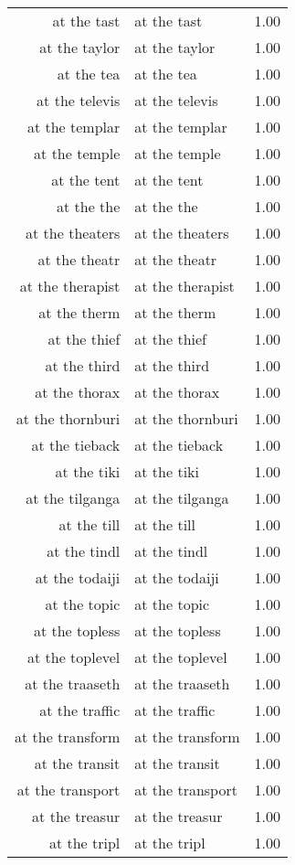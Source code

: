 \begin{table}[ht]
\begin{tabular}{rlr}
  at the tast & at the tast & 1.00 \\ 
  at the taylor & at the taylor & 1.00 \\ 
  at the tea & at the tea & 1.00 \\ 
  at the televis & at the televis & 1.00 \\ 
  at the templar & at the templar & 1.00 \\ 
  at the temple & at the temple & 1.00 \\ 
  at the tent & at the tent & 1.00 \\ 
  at the the & at the the & 1.00 \\ 
  at the theaters & at the theaters & 1.00 \\ 
  at the theatr & at the theatr & 1.00 \\ 
  at the therapist & at the therapist & 1.00 \\ 
  at the therm & at the therm & 1.00 \\ 
  at the thief & at the thief & 1.00 \\ 
  at the third & at the third & 1.00 \\ 
  at the thorax & at the thorax & 1.00 \\ 
  at the thornburi & at the thornburi & 1.00 \\ 
  at the tieback & at the tieback & 1.00 \\ 
  at the tiki & at the tiki & 1.00 \\ 
  at the tilganga & at the tilganga & 1.00 \\ 
  at the till & at the till & 1.00 \\ 
  at the tindl & at the tindl & 1.00 \\ 
  at the todaiji & at the todaiji & 1.00 \\ 
  at the topic & at the topic & 1.00 \\ 
  at the topless & at the topless & 1.00 \\ 
  at the toplevel & at the toplevel & 1.00 \\ 
  at the traaseth & at the traaseth & 1.00 \\ 
  at the traffic & at the traffic & 1.00 \\ 
  at the transform & at the transform & 1.00 \\ 
  at the transit & at the transit & 1.00 \\ 
  at the transport & at the transport & 1.00 \\ 
  at the treasur & at the treasur & 1.00 \\ 
  at the tripl & at the tripl & 1.00 \\ 

\end{tabular}
\end{table}
